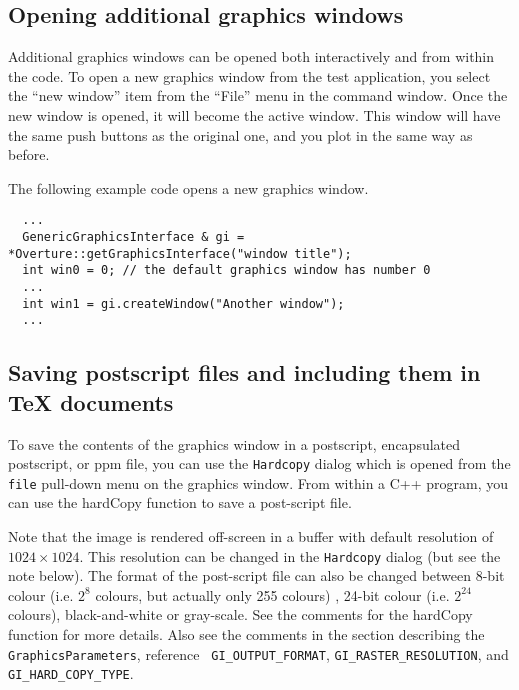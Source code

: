 \documentclass{article}
\begin{document}
\subsection{Opening additional graphics windows}
Additional graphics windows can be opened both interactively and
from within the code. To open a new graphics window from the
test application, you select the ``new window'' item from the
``File'' menu in the command window. Once the new window is opened, it
will become the active window. This window will have the same push
buttons as the original one, and you plot in the same way as before.

\vspace{0.1\baselineskip}
The following example code opens a new graphics window.
\begin{verbatim}
  ...
  GenericGraphicsInterface & gi = *Overture::getGraphicsInterface("window title");
  int win0 = 0; // the default graphics window has number 0
  ...
  int win1 = gi.createWindow("Another window");
  ...
\end{verbatim}


\subsection{Saving postscript files and including them in TeX documents}

To save the contents of the graphics window in a postscript,
encapsulated postscript, or ppm file, you can use the {\tt Hardcopy}
dialog which is opened from the {\tt file} pull-down menu on
the graphics window. From within a C++ program, you can use
the {\ff hardCopy} function to save a post-script file.

Note that the image is rendered off-screen in a buffer with default
resolution of $1024\times 1024$.  This resolution can be changed in
the {\tt Hardcopy} dialog (but see the note below).  The format of the
post-script file can also be changed between 8-bit colour (i.e. $2^8$
colours, but actually only 255 colours) , 24-bit colour (i.e. $2^{24}$
colours), black-and-white or gray-scale.  See the comments for the
{\ff hardCopy} function for more details. Also see the comments in the
section describing the {\tt GraphicsParameters}, reference {\tt
GI\_OUTPUT\_FORMAT}, {\tt GI\_RASTER\_RESOLUTION}, and {\tt
GI\_HARD\_COPY\_TYPE}.
\end{document}
